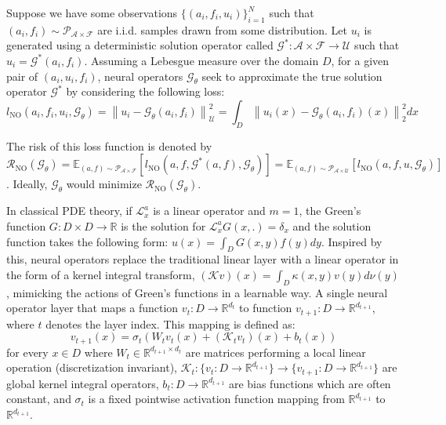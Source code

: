 \documentclass{article} %
\begin{document}
Suppose we have some observations $\{(a_i, f_i, u_i)\}_{i = 1}^N$ such that $(a_i, f_i) \sim \mathcal{P}_{\mathcal{A} \times \mathcal{F}}$ are i.i.d. samples drawn from some distribution. Let $u_i$ is generated using a deterministic solution operator called $\mathcal{G}^{*} : \mathcal{A} \times \mathcal{F} \to \mathcal{U}$ such that $u_i = \mathcal{G}^{*}(a_i, f_i)$. Assuming a Lebesgue measure over the domain $D$, for a given pair of $(a_i, u_i, f_i)$, neural operators  $\mathcal{G}_{\theta}$ seek to approximate the true solution operator $\mathcal{G}^*$ by considering the following loss:
\begin{equation} \label{eq:NOloss}
    l_{\text{NO}}(a_i, f_i, u_i, \mathcal{G}_{\theta}) = \left\|u_i - \mathcal{G}_{\theta}(a_i, f_i)\right\|^2_{\mathcal{U}} = \int_{D} \left\|u_i(x) - \mathcal{G}_{\theta}(a_i, f_i)(x)\right\|_2^2dx
\end{equation}

The risk of this loss function is denoted by $\mathcal{R}_{\text{NO}}(\mathcal{G}_{\theta}) = \mathbb{E}_{(a, f) \sim  \mathcal{P}_{\mathcal{A} \times \mathcal{F}}}\left[l_{\text{NO}}(a, f, \mathcal{G}^{*}(a, f), \mathcal{G}_{\theta})\right] = \mathbb{E}_{(a, f) \sim  \mathcal{P}_{\mathcal{A} \times \mathcal{U}}}\left[l_{\text{NO}}(a, f, u, \mathcal{G}_{\theta})\right]$. Ideally, $\mathcal{G}_{\theta}$ would minimize $\mathcal{R}_{\text{NO}}(\mathcal{G}_{\theta})$.

In classical PDE theory, if $\mathcal{L}_{x}^a$ is a linear operator and $m = 1$, the Green's function \citep{stakgold2011greens} $G: D \times D \to \mathbb{R}$ is the solution for $\mathcal{L}_{x}^aG(x, .) = \delta_x$ and the solution function takes the following form: $u(x) =\int_D G(x, y) f(y)dy$. Inspired by this, neural operators \citep{kovachki2023neural} replace the traditional linear layer with a linear operator in the form of a kernel integral transform, $(\mathcal{K}v)(x) = \int_{D}\kappa(x, y)v(y)d\nu(y)$, mimicking the actions of Green's functions in a learnable way.  A single neural operator layer that maps a function $v_t: D \to \mathbb{R}^{d_t}$ to function $v_{t + 1}: D \to \mathbb{R}^{d_{t + 1}}$, where $t$ denotes the layer index. This mapping is defined as: $$v_{t + 1}(x) = \sigma_t\left(W_tv_t(x) + (\mathcal{K}_tv_t)(x) + b_t(x)\right)$$ for every $x \in D$ where $W_t \in \mathbb{R}^{d_{t + 1} \times d_{t}}$ are matrices performing a local linear operation (discretization invariant), $\mathcal{K}_t: \{v_t: D \to \mathbb{R}^{d_{t + 1}}\} \to \{v_{t + 1}: D \to \mathbb{R}^{d_{t + 1}}\}$ are global kernel integral operators, $b_t: D \to \mathbb{R}^{d_{t + 1}}$ are bias functions which are often constant, and $\sigma_t$ is a fixed pointwise activation function mapping from $\mathbb{R}^{d_{t + 1}}$ to $\mathbb{R}^{d_{t + 1}}$.
\end{document}
